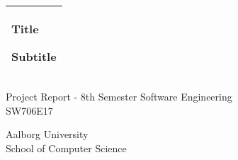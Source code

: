 %
\begin{titlepage}
  \addtolength{\hoffset}{0.5\evensidemargin-0.5\oddsidemargin} %
  \noindent%
  \begin{tabular}{@{}p{\textwidth}@{}}
    \toprule[2pt]
    \midrule
    \vspace{0.2cm}
    \begin{center}
    \Huge{\textbf{
      Title%
    }}
    \end{center}
    \begin{center}
      \Large{
        Subtitle %
      }
    \end{center}
    \vspace{0.2cm}\\
    \midrule
    \toprule[2pt]
  \end{tabular}
  \vspace{4 cm}
  \begin{center}
    {\large
      Project Report - 8th Semester Software Engineering %
    }\\
    \vspace{0.2cm}
    {\Large
      SW706E17%
    }
  \end{center}
  \vfill
  \begin{center}
  Aalborg University\\
  School of Computer Science
  \end{center}
\end{titlepage}
\clearpage
